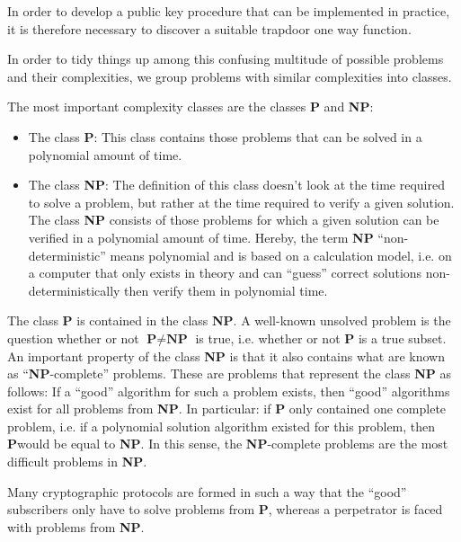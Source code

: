In order to develop a public key procedure that can be implemented in practice, 
it is therefore necessary to discover a suitable trapdoor one way function.\par

In order to tidy things up among this confusing multitude of possible problems 
and their complexities, we group problems with similar complexities into 
classes.

The most important complexity classes are the classes \textbf{P} and 
\textbf{NP}: 

\begin{itemize}

    \item The class \textbf{P}: This class contains those problems that can be 
solved in a polynomial  amount of time.
    
		\item The class \textbf{NP}: The definition of this class doesn't look at
		the time required to solve a problem, but rather at the time required to
		verify a given solution. The class \textbf{NP} consists of those problems
		for which a given solution can be verified in a polynomial  amount of time.
		Hereby, the term \textbf{NP} ``non-deterministic'' means polynomial and is
		based on a calculation model, i.e. on a computer that only exists in theory
		and can ``guess'' correct solutions non-deterministically then verify them
		in polynomial time.

\end{itemize}

The class \textbf{P} is contained in the class \textbf{NP}. A well-known 
unsolved problem is the question whether or not $ \textbf{P} \neq \textbf{NP} $ 
is true, i.e. whether or not \textbf{P} is a true subset. An important property 
of the class \textbf{NP} is that it also contains what are known as ``\textbf{NP}-complete''
problems. These are problems that represent the 
class \textbf{NP} as follows: If a ``good'' algorithm for such a 
problem exists, then ``good'' algorithms exist for all problems from 
\textbf{NP}. In particular: if \textbf{P} only contained one complete problem, 
i.e. if a polynomial  solution algorithm existed for this problem, then 
\textbf{P}would be equal to \textbf{NP}. In this sense, the \textbf{NP}-complete 
problems are the most difficult problems in \textbf{NP}.

Many cryptographic protocols are formed in such a way that the ``good''
subscribers only have to solve problems from \textbf{P}, whereas a 
perpetrator is faced with problems from \textbf{NP}.

